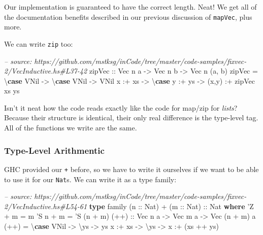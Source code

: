 \documentclass[]{article}
\newenvironment{Shaded}{}{}
\newcommand{\KeywordTok}[1]{\textcolor[rgb]{0.00,0.44,0.13}{\textbf{#1}}}
\newcommand{\DataTypeTok}[1]{\textcolor[rgb]{0.56,0.13,0.00}{#1}}
\newcommand{\CharTok}[1]{\textcolor[rgb]{0.25,0.44,0.63}{#1}}
\newcommand{\CommentTok}[1]{\textcolor[rgb]{0.38,0.63,0.69}{\textit{#1}}}
\newcommand{\OtherTok}[1]{\textcolor[rgb]{0.00,0.44,0.13}{#1}}
\newcommand{\FunctionTok}[1]{\textcolor[rgb]{0.02,0.16,0.49}{#1}}
\newcommand{\NormalTok}[1]{#1}
\begin{document}
Our implementation is guaranteed to have the correct length. Neat! We get all of
the documentation benefits described in our previous discussion of
\texttt{mapVec}, plus more.

We can write \texttt{zip} too:

\begin{Shaded}
\begin{Highlighting}[]
\CommentTok{-- source: https://github.com/mstksg/inCode/tree/master/code-samples/fixvec-2/VecInductive.hs#L37-42}
\OtherTok{zipVec ::} \DataTypeTok{Vec}\NormalTok{ n a }\OtherTok{->} \DataTypeTok{Vec}\NormalTok{ n b }\OtherTok{->} \DataTypeTok{Vec}\NormalTok{ n (a, b)}
\NormalTok{zipVec }\FunctionTok{=}\NormalTok{ \textbackslash{}}\KeywordTok{case}
    \DataTypeTok{VNil} \OtherTok{->}\NormalTok{ \textbackslash{}}\KeywordTok{case}
      \DataTypeTok{VNil} \OtherTok{->} \DataTypeTok{VNil}
\NormalTok{    x }\FunctionTok{:+}\NormalTok{ xs }\OtherTok{->}\NormalTok{ \textbackslash{}}\KeywordTok{case}
\NormalTok{      y }\FunctionTok{:+}\NormalTok{ ys }\OtherTok{->}\NormalTok{ (x,y) }\FunctionTok{:+}\NormalTok{ zipVec xs ys}
\end{Highlighting}
\end{Shaded}

Isn't it neat how the code reads exactly like the code for map/zip for
\emph{lists}? Because their structure is identical, their only real difference
is the type-level tag. All of the functions we write are the same.

\subsubsection{Type-Level Arithmentic}\label{type-level-arithmentic}

GHC provided our \texttt{+} before, so we have to write it ourselves if we want
to be able to use it for our \texttt{Nat}s. We can write it as a type family:

\begin{Shaded}
\begin{Highlighting}[]
\CommentTok{-- source: https://github.com/mstksg/inCode/tree/master/code-samples/fixvec-2/VecInductive.hs#L54-61}
\KeywordTok{type}\NormalTok{ family (}\OtherTok{n ::} \DataTypeTok{Nat}\NormalTok{) }\FunctionTok{+}\NormalTok{ (}\OtherTok{m ::} \DataTypeTok{Nat}\NormalTok{)}\OtherTok{ ::} \DataTypeTok{Nat} \KeywordTok{where}
    \CharTok{'Z   + m = m}
    \CharTok{'S n + m = '}\DataTypeTok{S}\NormalTok{ (n }\FunctionTok{+}\NormalTok{ m)}
\OtherTok{(++) ::} \DataTypeTok{Vec}\NormalTok{ n a }\OtherTok{->} \DataTypeTok{Vec}\NormalTok{ m a }\OtherTok{->} \DataTypeTok{Vec}\NormalTok{ (n }\FunctionTok{+}\NormalTok{ m) a}
\NormalTok{(}\FunctionTok{++}\NormalTok{) }\FunctionTok{=}\NormalTok{ \textbackslash{}}\KeywordTok{case}
    \DataTypeTok{VNil}    \OtherTok{->}\NormalTok{ \textbackslash{}ys }\OtherTok{->}\NormalTok{ ys}
\NormalTok{    x }\FunctionTok{:+}\NormalTok{ xs }\OtherTok{->}\NormalTok{ \textbackslash{}ys }\OtherTok{->}\NormalTok{ x }\FunctionTok{:+}\NormalTok{ (xs }\FunctionTok{++}\NormalTok{ ys)}
\end{Highlighting}
\end{Shaded}
\end{document}
